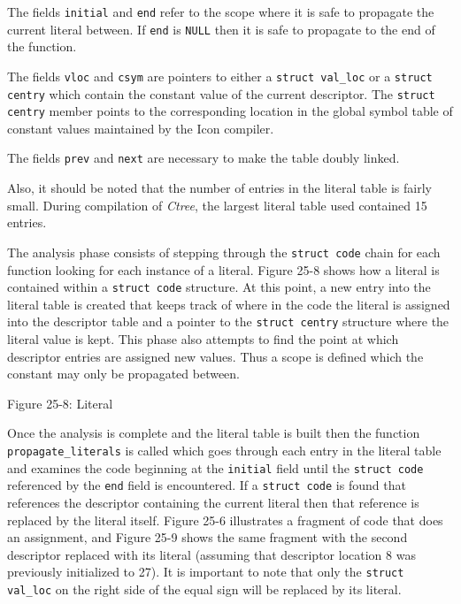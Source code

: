 The fields \texttt{initial} and \texttt{end} refer to the scope where
it is safe to propagate the current literal between. If \texttt{end}
is \texttt{NULL} then it is safe to propagate to the end of the
function.


The fields \texttt{vloc} and \texttt{csym} are pointers to either a
\texttt{struct val\_loc} or a \texttt{struct centry} which contain the
constant value of the current descriptor. The \texttt{struct centry}
member points to the corresponding location in the global symbol table
of constant values maintained by the Icon compiler.

The fields \texttt{prev} and \texttt{next} are necessary to make the
table doubly linked.

Also, it should be noted that the number of entries in the literal
table is fairly small. During compilation of \textit{Ctree}, the
largest literal table used contained 15 entries.

The analysis phase consists of stepping through the \texttt{struct
code} chain for each function looking for each instance of a
literal. Figure 25-8 shows how a literal is contained within a
\texttt{struct code} structure. At this point, a new entry into the
literal table is created that keeps track of where in the code the
literal is assigned into the descriptor table and a pointer to the
\texttt{struct centry} structure where the literal value is kept.
This phase also attempts to find the point at which descriptor entries
are assigned new values. Thus a scope is defined which the constant
may only be propagated between.


\bigskip

{\centering{}
Figure 25-8: Literal
\par}


Once the analysis is complete and the literal table is built then the
function \texttt{propagate\_literals} is called which goes through
each entry in the literal table and examines the code beginning at the
\texttt{initial} field until the \texttt{struct code} referenced by
the \texttt{end} field is encountered. If a \texttt{struct code} is
found that references the descriptor containing the current literal
then that reference is replaced by the literal itself. Figure 25-6
illustrates a fragment of code that does an assignment, and Figure
25-9 shows the same fragment with the second descriptor replaced with
its literal (assuming that descriptor location 8 was previously
initialized to 27). It is important to note that only the
\texttt{struct val\_loc} on the right side of the equal sign will be
replaced by its literal.


